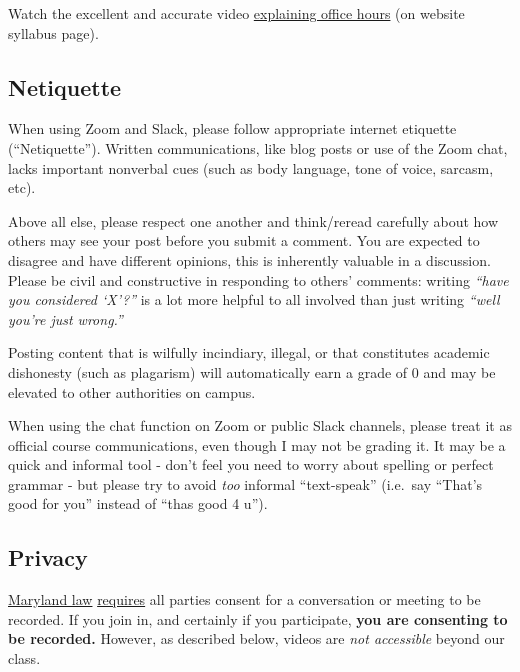 \documentclass{article}
\begin{document}
Watch the excellent and accurate video
\href{https://vimeo.com/270014784}{explaining office hours} (on website
syllabus page).

\hypertarget{netiquette}{%
\subsection*{Netiquette}\label{netiquette}}

When using Zoom and Slack, please follow appropriate internet etiquette
(``Netiquette''). Written communications, like blog posts or use of the
Zoom chat, lacks important nonverbal cues (such as body language, tone
of voice, sarcasm, etc).

Above all else, please respect one another and think/reread carefully
about how others may see your post before you submit a comment. You are
expected to disagree and have different opinions, this is inherently
valuable in a discussion. Please be civil and constructive in responding
to others' comments: writing \emph{``have you considered `X'?''} is a
lot more helpful to all involved than just writing \emph{``well you're
just wrong.''}

Posting content that is wilfully incindiary, illegal, or that
constitutes academic dishonesty (such as plagarism) will automatically
earn a grade of 0 and may be elevated to other authorities on campus.

When using the chat function on Zoom or public Slack channels, please
treat it as official course communications, even though I may not be
grading it. It may be a quick and informal tool - don't feel you need to
worry about spelling or perfect grammar - but please try to avoid
\emph{too} informal ``text-speak'' (i.e.~say ``That's good for you''
instead of ``thas good 4 u'').

\hypertarget{privacy}{%
\subsection*{Privacy}\label{privacy}}

\href{https://www.execvision.io/blog/maryland-call-recording-laws/}{Maryland
law}
\href{https://law.justia.com/codes/maryland/2005/gcj/10-402.html}{requires}
all parties consent for a conversation or meeting to be recorded. If you
join in, and certainly if you participate, \textbf{you are consenting to
be recorded.} However, as described below, videos are \emph{not
accessible} beyond our class.
\end{document}

